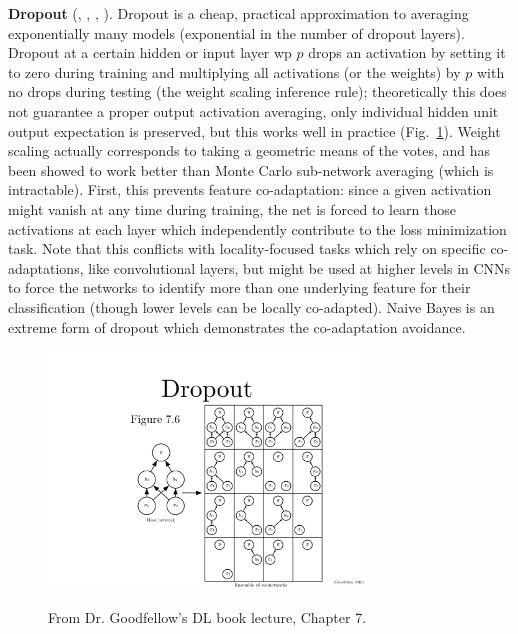 \documentclass{article}
\begin{document}
\textbf{Dropout} (, , , ). Dropout is a cheap, practical approximation to averaging exponentially many models (exponential in the number of dropout layers). Dropout at a certain hidden or input layer wp $p$ drops an activation by setting it to zero during training and multiplying all activations (or the weights) by $p$ with no drops during testing (the weight scaling inference rule); theoretically this does not guarantee a proper output activation averaging, only individual hidden unit output expectation is preserved, but this works well in practice (Fig.~\ref{fig:dropout}). Weight scaling actually corresponds to taking a geometric means of the votes, and has been showed to work better than Monte Carlo sub-network averaging (which is intractable). First, this prevents feature co-adaptation: since a given activation might vanish at any time during training, the net is forced to learn those activations at each layer which independently contribute to the loss minimization task. Note that this conflicts with locality-focused tasks which rely on specific co-adaptations, like convolutional layers, but might be used at higher levels in CNNs to force the networks to identify more than one underlying feature for their classification (though lower levels can be locally co-adapted). Naive Bayes is an extreme form of dropout which demonstrates the co-adaptation avoidance.
\begin{figure}[!h]
\centering
{\includegraphics[width=0.75\textwidth]{dropout.pdf}}
  \caption{From Dr. Goodfellow's DL book lecture, Chapter 7.}
\label{fig:dropout}
\end{figure}
\end{document}
